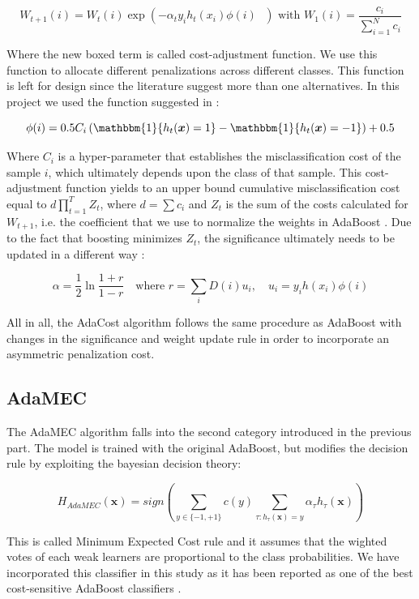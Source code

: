 \documentclass[conference]{IEEEtran}
\begin{document}
$$ W_{t+1}(i) = W_t(i) \exp \left(-\alpha_t y_i h_t(x_i) \boxed{\phi(i)} \text{ } \right) \text{  with  } W_1(i) = \frac{c_i}{\sum_{i=1}^Nc_i}$$

Where the new boxed term is called cost-adjustment function. We use this function to allocate different penalizations across different classes. This function is left for design since the literature suggest more than one alternatives. In this project we used the function suggested in \cite{ensembles_review}: 

$$\phi(i) = 0.5C_i \left( \mathbbm{1}\{ h_t(\boldsymbol x)=1\} -  \mathbbm{1}\{ h_t(\boldsymbol x)=-1\} \right)+0.5$$

Where $C_i$ is a hyper-parameter that establishes the misclassification cost of the sample $i$, which ultimately depends upon the class of that sample. This cost-adjustment function yields to an upper bound cumulative misclassification cost equal to $d\prod_{t=1}^TZ_t$, where $d= \sum c_i$ and $Z_t$ is the sum of the costs calculated for $W_{t+1}$, i.e. the coefficient that we use to normalize the weights in AdaBoost \cite{adacost}. Due to the fact that boosting minimizes $Z_t$, the significance ultimately needs to be updated in a different way \cite{improved_boosting}:

$$ \alpha = \frac{1}{2}\ln\frac{1+r}{1-r}\quad \text{where } r=\sum_iD(i)u_i, \quad u_i=y_i h(x_i)\phi(i)$$

All in all, the AdaCost algorithm follows the same procedure as AdaBoost with changes in the significance and weight update rule in order to incorporate an asymmetric penalization cost. 

\subsection{AdaMEC}
The AdaMEC algorithm falls into the second category introduced in the previous part. The model is trained with the original AdaBoost, but modifies the decision rule by exploiting the bayesian decision theory:

$$ H_{AdaMEC}(\boldsymbol x) = sign \left( \sum_{y \in \{-1,+1\}} c(y) \sum_{\tau: h_{\tau}(\boldsymbol x)=y} \alpha_{\tau} h_{\tau}(\boldsymbol x)\right)$$

This is called Minimum Expected Cost rule and it assumes that the wighted votes of each weak learners are proportional to the class probabilities. We have incorporated this classifier in this study as it has been reported as one of the best cost-sensitive AdaBoost classifiers \cite{need_boosting}.
\end{document}
